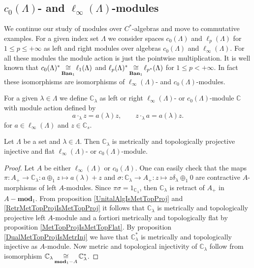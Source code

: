 
\subsection{\texorpdfstring{$c_0(\Lambda)$}{c0(Lambda)}- and \texorpdfstring{$\ell_\infty(\Lambda)$}{lInfty(Lambda)}-modules}
\label{SubSectionc0AndlInftyModules}

We continue our study of modules over $C^*$-algebras and move to commutative examples. For a given index set $\Lambda$ we consider spaces $c_0(\Lambda)$ and $\ell_p(\Lambda)$ for $1\leq p\leq+\infty$ as left and right modules over algebras $c_0(\Lambda)$ and $\ell_\infty(\Lambda)$. For all these modules the module action is just the pointwise multiplication. It is well known that $c_0(\Lambda)^*\mathop{\mathbin{\cong}}\limits_{\mathbf{Ban}_1}\ell_1(\Lambda)$ and  $\ell_p(\Lambda)^*\mathop{\mathbin{\cong}}\limits_{\mathbf{Ban}_1}\ell_{p^*}(\Lambda)$ for $1\leq p<+\infty$. In fact these isomorphisms are isomorphisms of $\ell_\infty(\Lambda)$- and $c_0(\Lambda)$-modules. 

For a given $\lambda\in\Lambda$ we define $\mathbb{C}_\lambda$ as left or right $\ell_\infty(\Lambda)$- or $c_0(\Lambda)$-module $\mathbb{C}$ with module action defined by
$$
a\cdot_\lambda z=a(\lambda)z,\qquad z\cdot_\lambda a=a(\lambda) z.
$$
for $a\in \ell_\infty(\Lambda)$ and $z\in\mathbb{C}_s$. 

\begin{proposition}\label{OneDimlInftyc0ModMetTopProjIngFlat} Let $\Lambda$ be a set and $\lambda\in\Lambda$. Then $\mathbb{C}_\lambda$ is metrically and topologically projective injective and flat $\ell_\infty(\Lambda)$- or $c_0(\Lambda)$-module.
\end{proposition}
\begin{proof} Let $A$ be either $\ell_\infty(\Lambda)$ or $c_0(\Lambda)$. One can easily check that the maps $\pi:A_+\to\mathbb{C}_\lambda:a\oplus_1 z\mapsto a(\lambda)+z$ and $\sigma:\mathbb{C}_\lambda\to A_+:z\mapsto z\delta_\lambda\oplus_1 0$ are contractive $A$-morphisms of left $A$-modules. Since $\pi\sigma=1_{\mathbb{C}_\lambda}$, then $\mathbb{C}_\lambda$ is retract of $A_+$ in $A-\mathbf{mod}_1$. From proposition \ref{UnitalAlgIsMetTopProj} and \ref{RetrMetTopProjIsMetTopProj} it follows that $\mathbb{C}_\lambda$ is metrically and topologically projective left $A$-module and a fortiori metrically and topologically flat by proposition \ref{MetTopProjIsMetTopFlat}. By proposition \ref{DualMetTopProjIsMetrInj} we have that $\mathbb{C}_\lambda^*$ is metrically and topologically injective as $A$-module. Now metric and topological injectivity of $\mathbb{C}_\lambda$ follow from isomorphism $\mathbb{C}_\lambda\mathop{\mathbin{\cong}}\limits_{\mathbf{mod}_1-A}\mathbb{C}_\lambda^*$.
\end{proof}

